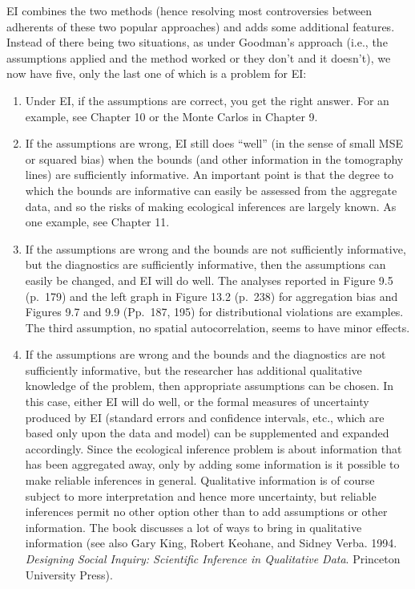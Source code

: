 \documentclass[11pt,titlepage]{article}
\begin{document}
EI combines the two methods (hence resolving most controversies
between adherents of these two popular approaches) and adds some
additional features.  Instead of there being two situations, as under
Goodman's approach (i.e., the assumptions applied and the method
worked or they don't and it doesn't), we now have five, only the last
one of which is a problem for EI:
\begin{enumerate}
\item Under EI, if the assumptions are correct, you get the right
  answer.  For an example, see Chapter 10 or the Monte Carlos in
  Chapter 9.

\item If the assumptions are wrong, EI still does ``well'' (in the
  sense of small MSE or squared bias) when the bounds (and other
  information in the tomography lines) are sufficiently informative.
  An important point is that the degree to which the bounds are
  informative can easily be assessed from the aggregate data, and so
  the risks of making ecological inferences are largely known.  As one
  example, see Chapter 11.

\item If the assumptions are wrong and the bounds are not sufficiently
  informative, but the diagnostics are sufficiently informative, then
  the assumptions can easily be changed, and EI will do well.  The
  analyses reported in Figure 9.5 (p.\ 179) and the left graph in
  Figure 13.2 (p.\ 238) for aggregation bias and Figures 9.7 and 9.9
  (Pp.\ 187, 195) for distributional violations are examples.  The
  third assumption, no spatial autocorrelation, seems to have minor
  effects.

\item If the assumptions are wrong and the bounds and the diagnostics
  are not sufficiently informative, but the researcher has additional
  qualitative knowledge of the problem, then appropriate assumptions
  can be chosen.  In this case, either EI will do well, or the formal
  measures of uncertainty produced by EI (standard errors and
  confidence intervals, etc., which are based only upon the data and
  model) can be supplemented and expanded accordingly.  Since the
  ecological inference problem is about information that has been
  aggregated away, only by adding some information is it possible to
  make reliable inferences in general.  Qualitative information is of
  course subject to more interpretation and hence more uncertainty,
  but reliable inferences permit no other option other than to add
  assumptions or other information.  The book discusses a lot of ways
  to bring in qualitative information (see also Gary King, Robert
  Keohane, and Sidney Verba.  1994.  \emph{Designing Social Inquiry:
    Scientific Inference in Qualitative Data}. Princeton University
  Press).


\end{enumerate}
\end{document}
